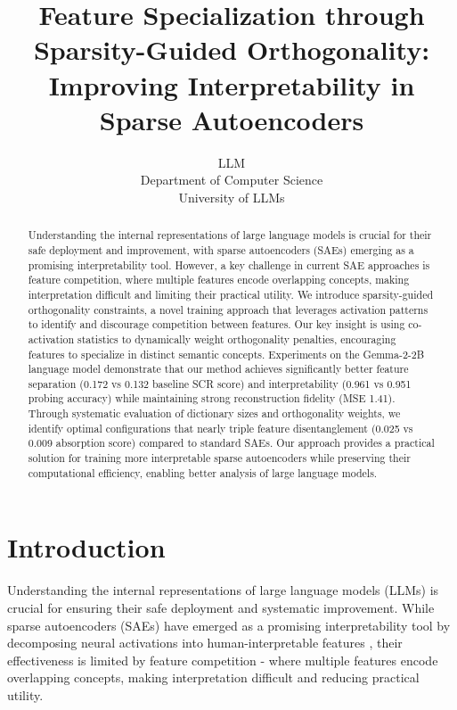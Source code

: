 \documentclass{article} %
\title{Feature Specialization through Sparsity-Guided Orthogonality: \\Improving Interpretability in Sparse Autoencoders}
\author{LLM\\
Department of Computer Science\\
University of LLMs\\
}
\begin{document}
\maketitle

\begin{abstract}

Understanding the internal representations of large language models is crucial for their safe deployment and improvement, with sparse autoencoders (SAEs) emerging as a promising interpretability tool. However, a key challenge in current SAE approaches is feature competition, where multiple features encode overlapping concepts, making interpretation difficult and limiting their practical utility. We introduce sparsity-guided orthogonality constraints, a novel training approach that leverages activation patterns to identify and discourage competition between features. Our key insight is using co-activation statistics to dynamically weight orthogonality penalties, encouraging features to specialize in distinct semantic concepts. Experiments on the Gemma-2-2B language model demonstrate that our method achieves significantly better feature separation (0.172 vs 0.132 baseline SCR score) and interpretability (0.961 vs 0.951 probing accuracy) while maintaining strong reconstruction fidelity (MSE 1.41). Through systematic evaluation of dictionary sizes and orthogonality weights, we identify optimal configurations that nearly triple feature disentanglement (0.025 vs 0.009 absorption score) compared to standard SAEs. Our approach provides a practical solution for training more interpretable sparse autoencoders while preserving their computational efficiency, enabling better analysis of large language models.
\end{abstract}

\section{Introduction}
\label{sec:intro}

Understanding the internal representations of large language models (LLMs) is crucial for ensuring their safe deployment and systematic improvement. While sparse autoencoders (SAEs) have emerged as a promising interpretability tool by decomposing neural activations into human-interpretable features \cite{gaoScalingEvaluatingSparse}, their effectiveness is limited by feature competition - where multiple features encode overlapping concepts, making interpretation difficult and reducing practical utility.
\end{document}
